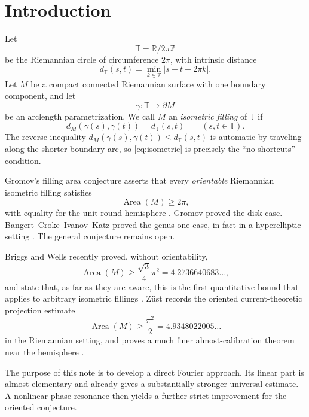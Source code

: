 \documentclass[11pt]{article}
\newcommand{\Area}{\operatorname{Area}}
\newcommand{\T}{\mathbb T}
\newcommand{\R}{\mathbb R}
\newcommand{\Z}{\mathbb Z}
\begin{document}
\begin{abstract}
Briggs and Wells recently state that their bound
$(\sqrt3/4)\pi^2$ appears to be the first quantitative lower bound applying
to arbitrary isometric fillings.  Z\"ust records the oriented global bound
$\pi^2/2$ and proves a substantially deeper almost-calibration theorem near
the hemisphere.  To our knowledge, the estimates in this note are new.
\end{abstract}

\tableofcontents

\section{Introduction}

Let
\[
        \T=\R/2\pi\Z
\]
be the Riemannian circle of circumference $2\pi$, with intrinsic distance
\[
        d_{\T}(s,t)=\min_{k\in\Z}|s-t+2\pi k|.
\]
Let $M$ be a compact connected Riemannian surface with one boundary
component, and let
\[
        \gamma:\T\longrightarrow\partial M
\]
be an arclength parametrization.  We call $M$ an \emph{isometric filling}
of $\T$ if
\begin{equation}\label{eq:isometric}
        d_M(\gamma(s),\gamma(t))=d_{\T}(s,t)
        \qquad(s,t\in\T).
\end{equation}
The reverse inequality
$d_M(\gamma(s),\gamma(t))\le d_{\T}(s,t)$ is automatic by traveling along
the shorter boundary arc, so \eqref{eq:isometric} is precisely the
``no-shortcuts'' condition.

Gromov's filling area conjecture asserts that every \emph{orientable}
Riemannian isometric filling satisfies
\[
        \Area(M)\ge 2\pi,
\]
with equality for the unit round hemisphere \cite{Gromov1983}.  Gromov
proved the disk case.  Bangert--Croke--Ivanov--Katz proved the genus-one
case, in fact in a hyperelliptic setting
\cite{BangertCrokeIvanovKatz2005}.  The general conjecture remains open.

Briggs and Wells recently proved, without orientability,
\[
        \Area(M)\ge\frac{\sqrt3}{4}\pi^2
        =4.2736640683\ldots,
\]
and state that, as far as they are aware, this is the first quantitative
bound that applies to arbitrary isometric fillings
\cite{BriggsWells2026}.  Z\"ust records the oriented current-theoretic
projection estimate
\[
        \Area(M)\ge\frac{\pi^2}{2}
        =4.9348022005\ldots
\]
in the Riemannian setting, and proves a much finer almost-calibration
theorem near the hemisphere \cite{Zuest2025}.

The purpose of this note is to develop a direct Fourier approach.  Its
linear part is almost elementary and already gives a substantially stronger
universal estimate.  A nonlinear phase resonance then yields a further
strict improvement for the oriented conjecture.
\end{document}
